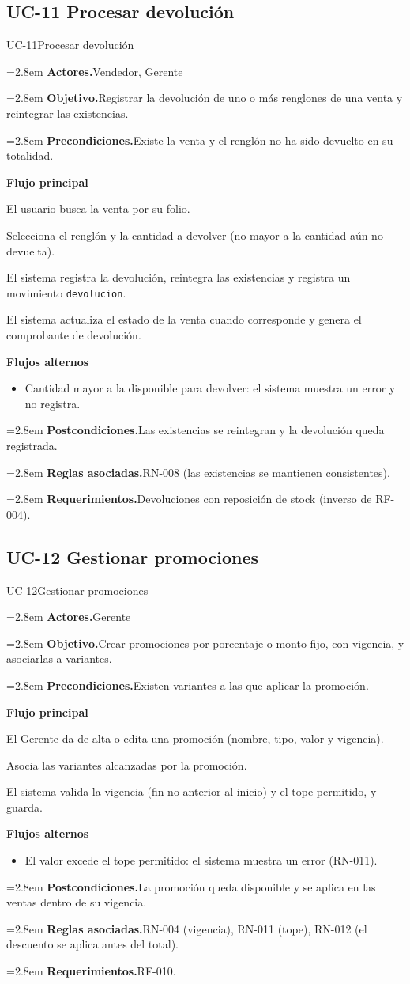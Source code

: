 \documentclass[11pt]{article}
\newcommand{\fila}[2]{\par\smallskip\noindent\hangindent=2.8em\hangafter=0
  \textbf{\sffamily\color{brand!80!black}#1.}\hspace{0.4em}#2\par}
\newcommand{\bloque}[1]{\par\smallskip\noindent\textbf{\sffamily\color{brand!80!black}#1}\par\nopagebreak}
\newenvironment{alternos}{\begin{itemize}[leftmargin=2.9em, itemsep=0.2ex, topsep=0.3ex]}{\end{itemize}}
\begin{document}
\subsection{UC-11 Procesar devolución}
\begin{ficha}{UC-11}{Procesar devolución}
\fila{Actores}{Vendedor, Gerente}
\fila{Objetivo}{Registrar la devolución de uno o más renglones de una venta y reintegrar las existencias.}
\fila{Precondiciones}{Existe la venta y el renglón no ha sido devuelto en su totalidad.}
\bloque{Flujo principal}
\begin{pasos}
  \item El usuario busca la venta por su folio.
  \item Selecciona el renglón y la cantidad a devolver (no mayor a la cantidad aún no devuelta).
  \item El sistema registra la devolución, reintegra las existencias y registra un movimiento \texttt{devolucion}.
  \item El sistema actualiza el estado de la venta cuando corresponde y genera el comprobante de devolución.
\end{pasos}
\bloque{Flujos alternos}
\begin{alternos}
  \item[\textbf{2a.}] Cantidad mayor a la disponible para devolver: el sistema muestra un error y no registra.
\end{alternos}
\fila{Postcondiciones}{Las existencias se reintegran y la devolución queda registrada.}
\fila{Reglas asociadas}{RN-008 (las existencias se mantienen consistentes).}
\fila{Requerimientos}{Devoluciones con reposición de stock (inverso de RF-004).}
\end{ficha}

\subsection{UC-12 Gestionar promociones}
\begin{ficha}{UC-12}{Gestionar promociones}
\fila{Actores}{Gerente}
\fila{Objetivo}{Crear promociones por porcentaje o monto fijo, con vigencia, y asociarlas a variantes.}
\fila{Precondiciones}{Existen variantes a las que aplicar la promoción.}
\bloque{Flujo principal}
\begin{pasos}
  \item El Gerente da de alta o edita una promoción (nombre, tipo, valor y vigencia).
  \item Asocia las variantes alcanzadas por la promoción.
  \item El sistema valida la vigencia (fin no anterior al inicio) y el tope permitido, y guarda.
\end{pasos}
\bloque{Flujos alternos}
\begin{alternos}
  \item[\textbf{3a.}] El valor excede el tope permitido: el sistema muestra un error (RN-011).
\end{alternos}
\fila{Postcondiciones}{La promoción queda disponible y se aplica en las ventas dentro de su vigencia.}
\fila{Reglas asociadas}{RN-004 (vigencia), RN-011 (tope), RN-012 (el descuento se aplica antes del total).}
\fila{Requerimientos}{RF-010.}
\end{ficha}
\end{document}
